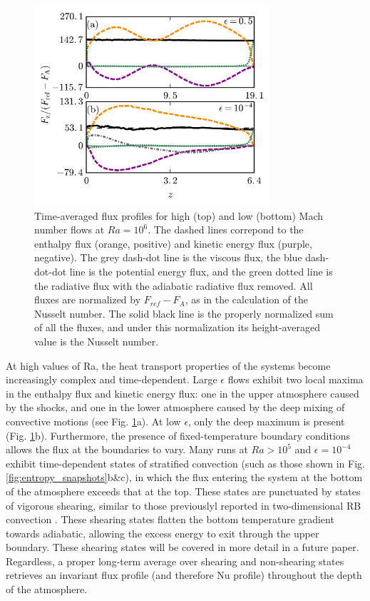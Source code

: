 \documentclass[aps, prl, twocolumn, nofootinbib, groupedaddress, amsfonts, amssymb, amsmath]{revtex4-1}
\begin{document}
\begin{figure}[t]
\includegraphics[width=3.4375in]{./figs/fluxes_fig.png}
\caption{Time-averaged flux profiles for high (top) and low (bottom) Mach number flows at $Ra = 10^6$.  
The dashed lines correpond to the
enthalpy flux (orange, positive) and kinetic energy flux (purple, negative).  The grey dash-dot line is the
viscous flux, the blue dash-dot-dot line is the potential energy flux, 
and the green dotted line is the radiative flux with the adiabatic radiative flux removed. All
fluxes are normalized by $F_{ref} - F_A$, as in the calculation of the Nusselt number.  The solid black line is
the properly normalized sum of all the fluxes, and under this normalization its height-averaged value is the
Nusselt number.
\label{fig:flux_profiles} }
\end{figure}

At high values of Ra, the heat transport properties of the systems become increasingly complex and time-dependent.
Large $\epsilon$ flows exhibit two local maxima in the enthalpy flux and kinetic energy flux: one in the upper 
atmosphere caused by the shocks, and one in the lower atmosphere caused by the deep mixing of convective motions
(see Fig. \ref{fig:flux_profiles}a).
At low $\epsilon$, only the deep maximum is present (Fig. \ref{fig:flux_profiles}b).  
Furthermore, the presence
of fixed-temperature boundary conditions allows the flux at the boundaries to vary.  Many runs at $Ra > 10^5$ and
$\epsilon = 10^{-4}$ exhibit time-dependent states of stratified convection (such as those shown in 
Fig. \ref{fig:entropy_snapshots}b\&c), in which the flux entering the system at the bottom of the atmosphere exceeds
that at the top.  These states are punctuated by states of vigorous shearing, similar to those previouslyl
reported in two-dimensional RB convection \cite{goluskin&all2014}.  These shearing states flatten the bottom temperature
gradient towards adiabatic, allowing the excess energy to exit through the upper boundary.  These shearing
states will be covered in more detail in a future paper.  Regardless, a proper long-term average over shearing
and non-shearing states retrieves an invariant flux profile (and therefore Nu profile) throughout the depth
of the atmosphere. 
\end{document}
